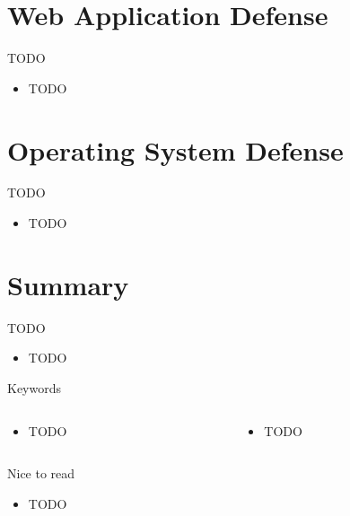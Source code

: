 \documentclass{curs}
\begin{document}
\section{Web Application Defense}

\begin{frame}{TODO}
  \begin{itemize}
    \item TODO
  \end{itemize}
\end{frame}


\section{Operating System Defense}

\begin{frame}{TODO}
  \begin{itemize}
    \item TODO
  \end{itemize}
\end{frame}


\section{Summary}

\begin{frame}{TODO}
  \begin{itemize}
    \item TODO
  \end{itemize}
\end{frame}

\begin{frame}{Keywords}
  \begin{columns}
    \begin{column}{0.5\textwidth}
      \begin{itemize}
        \item TODO
      \end{itemize}
    \end{column}
    \begin{column}{0.5\textwidth}
      \begin{itemize}
        \item TODO
      \end{itemize}
    \end{column}
  \end{columns}
\end{frame}

\begin{frame}{Nice to read}
  \begin{itemize}
    \item TODO
  \end{itemize}
\end{frame}
\end{document}

